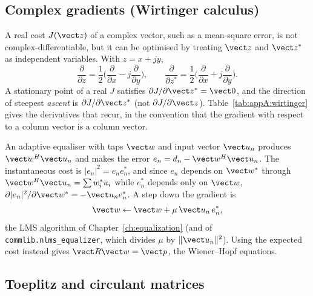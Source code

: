 \subsection{Complex gradients (Wirtinger calculus)}

A real cost $J(\vect z)$ of a complex vector, such as a mean-square error, is not
complex-differentiable, but it can be optimised by treating $\vect z$ and $\vect z^*$ as
independent variables. With $z=x+jy$,
\begin{equation}
\frac{\partial}{\partial z}=\frac12\Big(\frac{\partial}{\partial x}-j\frac{\partial}{\partial y}\Big),\qquad
\frac{\partial}{\partial z^*}=\frac12\Big(\frac{\partial}{\partial x}+j\frac{\partial}{\partial y}\Big).
\label{eq:appA:wirtinger}
\end{equation}
A stationary point of a real $J$ satisfies $\partial J/\partial\vect z^*=\vect0$, and the direction of
steepest \emph{ascent} is $\partial J/\partial\vect z^*$ (not $\partial J/\partial\vect z$).
Table~\ref{tab:appA:wirtinger} gives the derivatives that recur, in the convention that the gradient
with respect to a column vector is a column vector.

\begin{worked}
An adaptive equaliser with taps $\vect w$ and input vector $\vect u_n$ produces $\vect w^H\vect u_n$
and makes the error $e_n=d_n-\vect w^H\vect u_n$. The instantaneous cost is $|e_n|^2=e_ne_n^*$, and
since $e_n$ depends on $\vect w^*$ through $\vect w^H\vect u_n=\sum w_i^*u_i$ while $e_n^*$ depends
only on $\vect w$, $\partial|e_n|^2/\partial\vect w^*=-\vect u_ne_n^*$. A step down the gradient is
\[
\vect w\leftarrow\vect w+\mu\,\vect u_n\,e_n^*,
\]
the LMS algorithm of Chapter~\ref{ch:equalization} (and of \texttt{commlib.nlms\_equalizer}, which
divides $\mu$ by $\|\vect u_n\|^2$). Using the expected cost instead gives $\vect R\vect w=\vect p$,
the Wiener--Hopf equations.
\end{worked}


\subsection{Toeplitz and circulant matrices}
\label{sec:appA:circulant}

